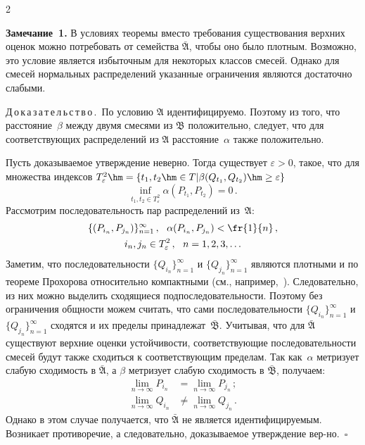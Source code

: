 \begin{multicols}{2}
\medskip

\noindent
\textbf{Замечание~1.}
В условиях теоремы вместо требования существования верхних оценок
можно потребовать от семейства $\bar{\mathfrak{A}}$, чтобы оно было
плотным. Возможно, это условие является избыточным для некоторых
классов смесей. Однако для смесей нормальных распределений указанные
ограничения являются достаточно слабыми.

\medskip

\noindent
Д\,о\,к\,а\,з\,а\,т\,е\,л\,ь\,с\,т\,в\,о\,.\ 
По условию $\mathfrak{A}$ идентифицируемо. Поэтому из того, что
расстояние~$\beta$ между двумя смесями из $\mathfrak{B}$
положительно, следует, что для соответствующих распределений из
$\mathfrak{A}$ расстояние~$\alpha$ также положительно. 

Пусть
доказываемое утверждение неверно. Тогда существует $\varepsilon >
0$, такое, что для множества индексов
$T^2_\varepsilon \hm= \left\{
 t_1, t_2 \hm\in T|
\beta(Q_{t_1}, Q_{t_2})\hm \ge \varepsilon
\right\}$
$$ \inf\limits_{t_1, t_2 \in T^2_\varepsilon}
 \alpha(P_{t_1}, P_{t_2}) =0\,.
$$
Рассмотрим последовательность пар распределений из~$\mathfrak{A}$:
\begin{multline*}
\{(P_{i_n}, P_{j_n})\}^{\infty}_{n=1}\,, \ \  \alpha(P_{i_n}, P_{j_n})
< \fr{1}{n}\,, \\  i_n, j_n \in T^2_\varepsilon\,, \ \ n =
1,2,3,\ldots
\end{multline*}
Заметим, что последовательности $\{ Q_{i_n} \}^{\infty}_{n=1}$ и $\{
Q_{j_n} \}^{\infty}_{n=1}$ являются плотными и по теореме Прохорова
относительно компактными (см., например,~\cite{bilingRus}).
Следовательно, из них можно выделить сходящиеся
подпоследовательности. Поэтому без ограничения общности можем
считать, что сами последовательности   $\{ Q_{i_n}
\}^{\infty}_{n=1}$ и $\{ Q_{j_n} \}^{\infty}_{n=1}$ сходятся  и их
пределы принадлежат~$\bar{\mathfrak{B}}$. Учитывая, что для
$\bar{\mathfrak{A}}$ существуют верхние оценки устойчивости,
соответствующие последовательности смесей будут также сходиться к
соответствующим пределам. Так как~$\alpha$ метризует слабую сходимость
в $\bar{\mathfrak{A}}$, а $\beta$ метризует слабую сходимость в
$\bar{\mathfrak{B}}$, получаем:
\begin{align*}
\lim_{n\rightarrow\infty} P_{i_n} &= \lim_{n\rightarrow\infty} P_{j_n}\,; \\
\lim_{n\rightarrow\infty} Q_{i_n} & \neq \lim_{n\rightarrow\infty} Q_{j_n}\,. 
\end{align*}
Однако в этом случае получается, что $\bar{\mathfrak{A}}$ не
является идентифицируемым. Возникает противоречие, а следовательно,
доказываемое утверждение вер-\linebreak но.\hfill~$\square$


\end{multicols}
